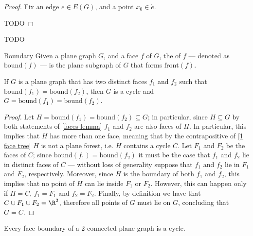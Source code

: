 \documentclass[a4paper, 12pt]{report}
\begin{document}
    \begin{proof}
        Fix an edge $e \in E(G)$, and a point $x_0 \in \mathring e$.


        TODO 
    \end{proof}

    TODO 

    \begin{frameddefn}{Boundary}
        Given a plane graph $G$, and a face $f$ of $G$, the  of $f$ --- denoted as $\mathrm{bound}(f)$ --- is the plane subgraph of $G$ that forms $\mathrm{front}(f)$.
    \end{frameddefn}
    
    \begin{framedlem}{}
        If $G$ is a plane graph that has two distinct faces $f_1$ and $f_2$ such that $\mathrm{bound}(f_1) = \mathrm{bound}(f_2)$, then $G$ is a cycle and $G = \mathrm{bound}(f_1) = \mathrm{bound}(f_2)$.
    \end{framedlem}

    \begin{proof}
        Let $H = \mathrm{bound}(f_1) = \mathrm{bound}(f_2) \subseteq G$; in particular, since $H \subseteq G$ by both statements of \cref{faces lemma} $f_1$ and $f_2$ are also faces of $H$. In particular, this implies that $H$ has more than one face, meaning that by the contrapositive of \cref{1 face tree} $H$ is not a plane forest, i.e. $H$ contains a cycle $C$. Let $F_1$ and $F_2$ be the faces of $C$; since $\mathrm{bound}(f_1) = \mathrm{bound}(f_2)$ it must be the case that $f_1$ and $f_2$ lie in distinct faces of $C$ --- without loss of generality suppose that $f_1$ and $f_2$ lie in $F_1$ and $F_2$, respectively. Moreover, since $H$ is the boundary of both $f_1$ and $f_2$, this implies that no point of $H$ can lie inside $F_1$ or $F_2$. However, this can happen only if $H = C$, $f_1 = F_1$ and $f_2 = F_2$. Finally, by definition we have that $C \cup F_1 \cup F_2 = \R^2$, therefore all points of $G$ must lie on $G$, concluding that $G = C$.
    \end{proof}

    \begin{framedprop}[label={2conn planar}]{}
        Every face boundary of a 2-connected plane graph is a cycle.
    \end{framedprop}
    
\end{document}
